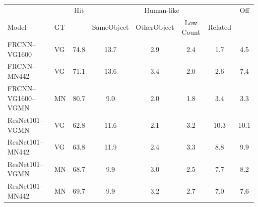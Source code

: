 \begin{table}[t]
	\centering
	\small
\begin{tabular}{ll||c|cccc|c}
	\toprule
	  &  & Hit & \multicolumn{4}{c|}{Human-like} & Off \\
	Model &  GT &  & SameObject &  OtherObject &  Low Count &  Related &   \\
	\midrule
	FRCNN--VG1600&VG &         74.8 &                13.7 &                  2.9 &              2.4 &              1.7 &          4.5 \\
	FRCNN--MN442&VG &         71.1 &                13.6 &                  3.4 &              2.0 &              2.6 &          7.4 \\
	\midrule
	FRCNN--VG1600--VGMN&MN &         80.7 &                 9.0 &                  2.0 &              1.8 &              3.4 &          3.3 \\
	\midrule
	ResNet101--VGMN&VG &         62.8 &                11.6 &                  2.1 &              3.2 &             10.3 &         10.1 \\
	ResNet101--MN442&VG &         63.8 &                11.9 &                  2.4 &              3.3 &              8.8 &          9.9 \\
	ResNet101--VGMN&MN &         68.7 &                 9.9 &                  3.0 &              2.5 &              7.7 &          8.2 \\
	ResNet101--MN442&MN &         69.7 &                 9.9 &                  3.2 &              2.7 &              7.0 &          7.6 \\
	
	
	
	\bottomrule
\end{tabular}
\end{table}

